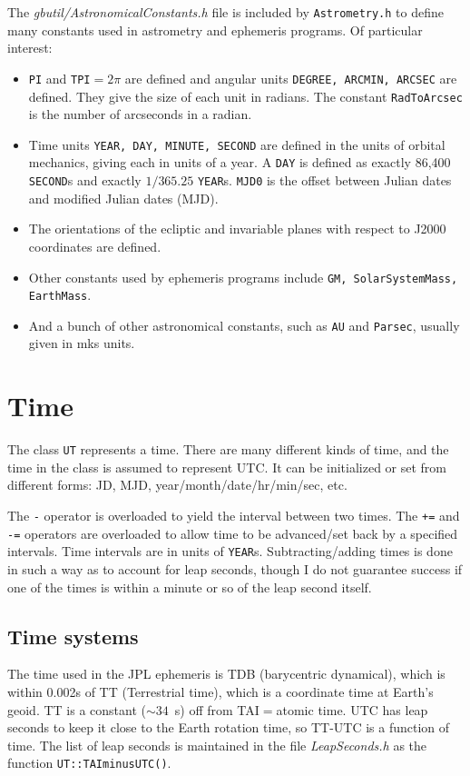 \documentclass[11pt,preprint,flushrt]{aastex}
\begin{document}
The \textit{gbutil/AstronomicalConstants.h} file is included by {\tt Astrometry.h} to define many constants used in astrometry and ephemeris programs.  Of particular interest:
\begin{itemize}
\item {\tt PI} and {\tt TPI}$=2\pi$ are defined and angular units {\tt DEGREE, ARCMIN, ARCSEC} are defined.  They give the size of each unit in radians.  The constant {\tt RadToArcsec} is the number of arcseconds in a radian.
\item Time units {\tt YEAR, DAY, MINUTE, SECOND} are defined in the units of orbital mechanics, giving each in units of a year.  A {\tt DAY} is defined as exactly 86,400 {\tt SECOND}s and exactly $1/365.25$ {\tt YEAR}s.  {\tt MJD0} is the offset between Julian dates and modified Julian dates (MJD).
\item The orientations of the ecliptic and invariable planes with respect to J2000 coordinates are defined.
\item Other constants used by ephemeris programs include {\tt GM, SolarSystemMass, EarthMass}.
\item And a bunch of other astronomical constants, such as {\tt AU} and {\tt Parsec}, usually given in mks units.
\end{itemize}

\section{Time}
The class {\tt UT} represents a time.  There are many different kinds of time, and the time in the class is assumed to represent UTC.  It can be initialized or set from different forms: JD, MJD, year/month/date/hr/min/sec, etc.

The {\tt -} operator is overloaded to yield the interval between two times.  The {\tt +=} and {\tt -=} operators are overloaded to allow time to be advanced/set back by a specified intervals.  Time intervals are in units of {\tt YEAR}s. 
Subtracting/adding times is done in such a way as to account for leap
seconds, though I do not guarantee success if one of the times is within
a minute or so of the leap second itself.  

\subsection{Time systems}
The time used in the JPL ephemeris is TDB (barycentric dynamical), which
is within 0.002s of TT (Terrestrial time), which is a coordinate time at
Earth's geoid.  TT is a constant ($\sim34$~s) off from TAI$=$atomic time.
UTC has leap seconds to keep it close to the Earth rotation time, so
TT-UTC is a function of time. The list of leap seconds is maintained
in the file {\it LeapSeconds.h} as the function {\tt UT::TAIminusUTC()}.
\end{document}
